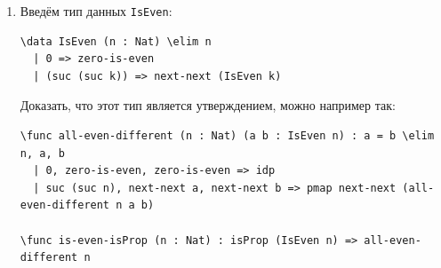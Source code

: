 \documentclass[10pt,a4paper,oneside]{article}
\begin{document}
\begin{enumerate}
\url{https://arend-lang.github.io/documentation/tutorial/PartI/universes.html}

Рассмотрим определения:
\begin{verbatim}
\func ChurchT (x : \Type) => (x -> x) -> (x -> x)
\func Church => \Pi (x : \Type) -> ChurchT x
\func Zero : Church => \lam t f x => x

\func incT (t : \Type) (n : ChurchT t) => \lam f x => n f (f x)
\func pair_plus (type : \Type) (pair : \Sigma (ChurchT type) (ChurchT type)) :
  \Sigma (ChurchT type) (ChurchT type) => (pair.2, incT type pair.2)
\func dec (n : Church) : Church => \lam (t : \Type) =>
    (n (\Sigma (ChurchT t) (ChurchT t)) (pair_plus t) (Zero t, Zero t)).1
\func sub (a : Church (\suc\lp)) (b : Church) => a (Church \lp) dec b
\end{verbatim}

Определите, развивая определения выше:
\begin{enumerate}
\item Операцию умножения.
\item Операцию <<деление на три>> (естественно, в версии, не использующей $Y$-комбинатор).
\item Операцию возведения в степень, определявшуюся как $\lambda m.\lambda n.n\ m$.
\item Деление.
\item Вычисление факториала.
\end{enumerate}

\item Введём тип данных \verb!IsEven!:

\begin{verbatim}
\data IsEven (n : Nat) \elim n
  | 0 => zero-is-even
  | (suc (suc k)) => next-next (IsEven k)
\end{verbatim}

Доказать, что этот тип является утверждением, можно например так:

\begin{verbatim}
\func all-even-different (n : Nat) (a b : IsEven n) : a = b \elim n, a, b
  | 0, zero-is-even, zero-is-even => idp
  | suc (suc n), next-next a, next-next b => pmap next-next (all-even-different n a b)

\func is-even-isProp (n : Nat) : isProp (IsEven n) => all-even-different n
\end{verbatim}


\end{enumerate}
\end{document}
